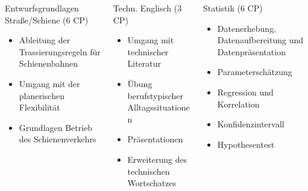 \documentclass[slidestop,compress,mathserif, aspectratio = 169, 9pt]{beamer}
\begin{document}
{ \begin{columns}[t] 
     \begin{column}[T]{4.5cm} 
     Entwurfsgrundlagen Stra{\ss}e/Schiene (6 CP)
     	\begin{itemize}
	\item Ableitung der Trassierungsregeln für Schienenbahnen%
	\item Umgang mit der planerischen Flexibilität
	\item Grundlagen Betrieb des Schienenverkehrs%
     	\end{itemize}
     \end{column}
     	\begin{column}[T]{4.5cm} 
	Techn. Englisch (3 CP)
     	\begin{itemize}
     	\item  Umgang mit technischer Literatur
	\item Übung berufstypischer Alltagssituationen
	\item Präsentationen
	\item Erweiterung des technischen Wortschatzes
     	\end{itemize}
     \end{column}
     \begin{column}[T]{4.5cm} 
     Statistik (6 CP)
     	\begin{itemize}
     	\item Datenerhebung, Datenaufbereitung und Datenpräsentation
     	\item Parameterschätzung
     	\item Regression und Korrelation
     	\item Konfidenzintervall
     	\item Hypothesentest
     	\end{itemize}
     \end{column}
 \end{columns}

}

\end{document}

